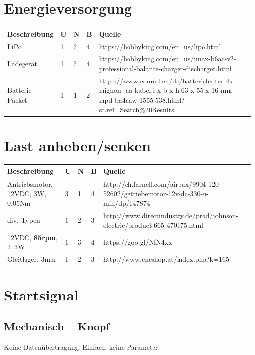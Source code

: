 \documentclass[a4paper]{report}
\begin{document}
\section{Energieversorgung}
\vspace{1em}
\noindent
\begin{tabular}{|p{}|p{}|p{}|p{}|p{}|}
	\hline
	\textbf{Beschreibung} & \textbf{U} & \textbf{N} & \textbf{B} & \textbf{Quelle} \\
	\hline
	LiPo & 1 & 3 & 4 & https://hobbyking.com/en\_us/lipo.html \\
	\hline
	Ladegerät & 1 & 3 & 4 & https://hobbyking.com/en\_us/imax-b6ac-v2-professional-balance-charger-discharger.html \\
	\hline
	Batterie-Packet & 1 & 1 & 2 & https://www.conrad.ch/de/batteriehalter-4x-mignon-
	aa-kabel-l-x-b-x-h-63-x-55-x-16-mm-mpd-ba4aaw-1555
	538.html?sc.ref=Search\%20Results
	\\
	\hline
\end{tabular}

\section{Last anheben/senken}
\begin{tabular}{|p{}|p{}|p{}|p{}|p{}|}
	\hline
	\textbf{Beschreibung} & \textbf{U} & \textbf{N} & \textbf{B} & \textbf{Quelle} \\
	\hline
	Antriebsmotor, 12VDC, 3W, 0.05Nm & 3 & 1 & 4 &
	http://ch.farnell.com/airpax/9904-120-52602/getriebemotor-12v-dc-330-u-min/dp/147874  \\
	\hline
	div. Typen & 1 & 2 & 3 & http://www.directindustry.de/prod/johnson-electric/product-665-470175.html\\
	\hline
	12VDC, \textbf{85rpm}, 2~3W & 1 & 3 & 4 & https://goo.gl/NfN4xx\\
	\hline
	Gleitlager, 3mm & 1 & 2 & 3 & http://www.cncshop.at/index.php?k=165\\
	\hline
\end{tabular}

\section{Startsignal}
\subsection{Mechanisch – Knopf}
Keine Datenübertragung, Einfach, keine Parameter
\end{document}

